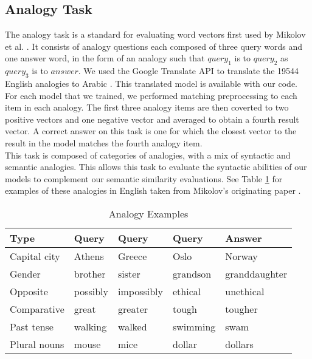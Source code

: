 \subsection{Analogy Task}

The analogy task is a standard for evaluating word vectors first used by Mikolov et al. \cite{mikoloveffic:2013}. It consists of analogy questions each composed of three query words and one answer word, in the form of an analogy such that $query_1$ is to $query_2$ as $query_3$ is to $answer$. We used the Google Translate API to translate the 19544 English analogies to Arabic \cite{google:online}. This translated model is available with our code. For each model that we trained, we performed matching preprocessing to each item in each analogy. The first three analogy items are then coverted to two positive vectors and one negative vector and averaged to obtain a fourth result vector. A correct answer on this task is one for which the closest vector to the result in the model matches the fourth analogy item.
\\
This task is composed of categories of analogies, with a mix of syntactic and semantic analogies. This allows this task to evaluate the syntactic abilities of our models to complement our semantic similarity evaluations. See Table \ref{table:analogyexamples} for examples of these analogies in English taken from Mikolov's originating paper \cite{mikoloveffic:2013}.

\begin{table}
\begin{tabular}{l|l|l|l|l}
\textbf{Type} & \textbf{Query} & \textbf{Query} & \textbf{Query} & \textbf{Answer}\\
\hline
Capital city & Athens & Greece & Oslo & Norway \\
Gender & brother & sister & grandson & granddaughter \\
Opposite & possibly & impossibly & ethical & unethical \\
Comparative & great & greater &  tough & tougher \\
Past tense & walking & walked & swimming & swam \\
Plural nouns & mouse & mice & dollar & dollars \\
\end{tabular}
\caption{Analogy Examples}
\label{table:analogyexamples}
\end{table}




